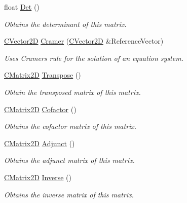 \begin{DoxyCompactItemize}
\item 
float \hyperlink{struct_c_matrix2_d_ad9e33d9f2035bda7b0e1ed484029135c}{Det} ()
\begin{DoxyCompactList}\small\item\em Obtains the determinant of this matrix. \end{DoxyCompactList}\item 
\hyperlink{struct_c_vector2_d}{C\+Vector2D} \hyperlink{struct_c_matrix2_d_a2bf2c20d1549add01acdf9acdd501263}{Cramer} (\hyperlink{struct_c_vector2_d}{C\+Vector2D} \&Reference\+Vector)
\begin{DoxyCompactList}\small\item\em Uses Cramer\textquotesingle{}s rule for the solution of an equation system. \end{DoxyCompactList}\item 
\hyperlink{struct_c_matrix2_d}{C\+Matrix2D} \hyperlink{struct_c_matrix2_d_a7c9085859bacdeb6a331012cdf896925}{Transpose} ()
\begin{DoxyCompactList}\small\item\em Obtain the transposed matrix of this matrix. \end{DoxyCompactList}\item 
\hyperlink{struct_c_matrix2_d}{C\+Matrix2D} \hyperlink{struct_c_matrix2_d_a07414e0afc6732c9896a2b4661f11d1c}{Cofactor} ()
\begin{DoxyCompactList}\small\item\em Obtains the cofactor matrix of this matrix. \end{DoxyCompactList}\item 
\hyperlink{struct_c_matrix2_d}{C\+Matrix2D} \hyperlink{struct_c_matrix2_d_a95c1abe54b279ba1b925cc0fa9c23080}{Adjunct} ()
\begin{DoxyCompactList}\small\item\em Obtains the adjunct matrix of this matrix. \end{DoxyCompactList}\item 
\hyperlink{struct_c_matrix2_d}{C\+Matrix2D} \hyperlink{struct_c_matrix2_d_ae1b182689b62351fb0f9d5a763d405e6}{Inverse} ()
\begin{DoxyCompactList}\small\item\em Obtains the inverse matrix of this matrix. \end{DoxyCompactList}\end{DoxyCompactItemize}
